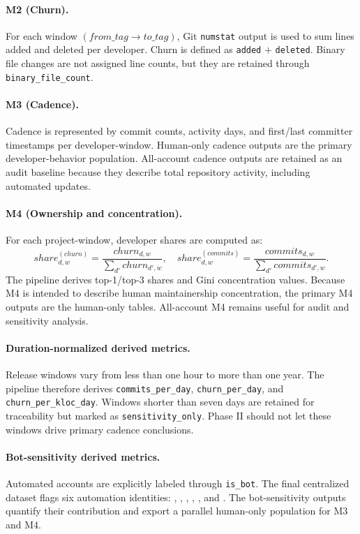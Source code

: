 \paragraph{M2 (Churn).}
For each window $(from\_tag\rightarrow to\_tag)$, Git \texttt{numstat} output is used to sum lines added and deleted per developer.
Churn is defined as \texttt{added} $+$ \texttt{deleted}. Binary file changes are not assigned line counts, but they are retained
through \texttt{binary\_file\_count}.

\paragraph{M3 (Cadence).}
Cadence is represented by commit counts, activity days, and first/last committer timestamps per developer-window. Human-only cadence
outputs are the primary developer-behavior population. All-account cadence outputs are retained as an audit baseline because they
describe total repository activity, including automated updates.

\paragraph{M4 (Ownership and concentration).}
For each project-window, developer shares are computed as:
\[
share^{(churn)}_{d,w}=\frac{churn_{d,w}}{\sum_{d'}churn_{d',w}}, \quad
share^{(commits)}_{d,w}=\frac{commits_{d,w}}{\sum_{d'}commits_{d',w}}.
\]
The pipeline derives top-1/top-3 shares and Gini concentration values. Because M4 is intended to describe human maintainership
concentration, the primary M4 outputs are the human-only tables. All-account M4 remains useful for audit and sensitivity analysis.

\paragraph{Duration-normalized derived metrics.}
Release windows vary from less than one hour to more than one year. The pipeline therefore derives \texttt{commits\_per\_day},
\texttt{churn\_per\_day}, and \texttt{churn\_per\_kloc\_day}. Windows shorter than seven days are retained for traceability but
marked as \texttt{sensitivity\_only}. Phase II should not let these windows drive primary cadence conclusions.

\paragraph{Bot-sensitivity derived metrics.}
Automated accounts are explicitly labeled through \texttt{is\_bot}. The final centralized dataset flags six automation identities:
, , , ,
, and . The bot-sensitivity outputs quantify their contribution and export a parallel
human-only population for M3 and M4.


